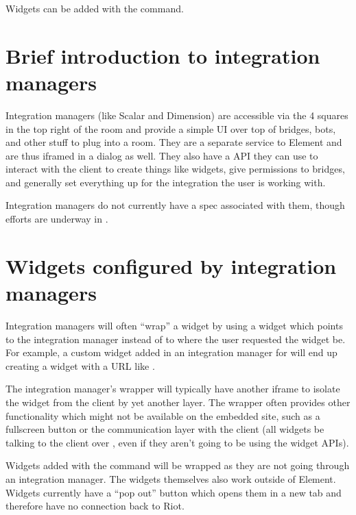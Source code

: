 \documentclass[letterpaper,10pt,openany,oneside,english]{sphinxmanual}
\begin{document}
\sphinxAtStartPar
Widgets can be added with the  command.


\chapter{Brief introduction to integration managers}
\label{\detokenize{jitsi-dev:brief-introduction-to-integration-managers}}
\sphinxAtStartPar
Integration managers (like Scalar and Dimension) are accessible via the 4 squares in
the top right of the room and provide a simple UI over top of bridges, bots, and other
stuff to plug into a room. They are a separate service to Element and are thus iframed
in a dialog as well. They also have a  API they can use to interact with
the client to create things like widgets, give permissions to bridges, and generally
set everything up for the integration the user is working with.

\sphinxAtStartPar
Integration managers do not currently have a spec associated with them, though efforts
are underway in .


\chapter{Widgets configured by integration managers}
\label{\detokenize{jitsi-dev:widgets-configured-by-integration-managers}}
\sphinxAtStartPar
Integration managers will often “wrap” a widget by using a widget  which points
to the integration manager instead of to where the user requested the widget be. For
example, a custom widget added in an integration manager for  will
end up creating a widget with a URL like .

\sphinxAtStartPar
The integration manager’s wrapper will typically have another iframe to isolate the
widget from the client by yet another layer. The wrapper often provides other functionality
which might not be available on the embedded site, such as a fullscreen button or the
communication layer with the client (all widgets  be talking to the client
over , even if they aren’t going to be using the widget APIs).

\sphinxAtStartPar
Widgets added with the  command will  be wrapped as they are not going
through an integration manager. The widgets themselves  also work outside of
Element. Widgets currently have a “pop out” button which opens them in a new tab and
therefore have no connection back to Riot.
\end{document}
